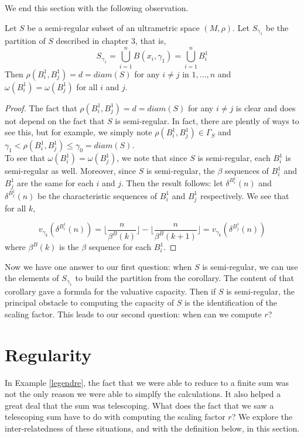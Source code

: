 We end this section with the following observation.

\begin{proposition}
	Let $S$ be a semi-regular subset of an ultrametric space $(M,\rho)$. Let $S_{\gamma_1}$ be the partition of $S$ described in chapter $3$, that is,
	\[S_{\gamma_1} = \bigcup_{i=1}^{n} B(x_i,\gamma_1) = \bigcup_{i=1}^{n} B^1_i\]
	Then $\rho(B^1_i, B^1_j) = d = diam(S)$ for any $i \neq j$ in $1,\ldots,n$ and $\omega( B^1_i) = \omega( B^1_j)$ for all $i$ and $j$.
\end{proposition}

\begin{proof}
	The fact that  $\rho(B^1_i, B^1_j) = d = diam(S)$ for any $i \neq j$ is clear and does not depend on the fact that $S$ is semi-regular. In fact, there are plently of ways to see this, but for example, we simply note $\rho(B^1_i, B^1_j) \in \Gamma_S$  and $ \gamma_1 < \rho(B^1_i, B^1_j)\leq \gamma_0 = diam(S)$.\\
	
	To see that $\omega( B^1_i) = \omega( B^1_j)$, we note that since $S$ is semi-regular, each $B^1_i$ is semi-regular as well. Moreover, since $S$ is semi-regular, the $\beta$ sequences of $B^1_i$ and $B^1_j$ are the same for each $i$ and $j$. Then the result follows: let $\delta^{B^1_i}(n)$ and $\delta^{B^1_j}(n)$ be the characteristic sequences of $B^1_i$ and $B^1_j$ respectively. We see that for all $k$,
	  
	  \[v_{\gamma_k}(\delta^{B^1_i}(n)) =  \lfloor\frac{n}{\beta^B(k)}\rfloor - \lfloor\frac{n}{\beta^B(k+1)}\rfloor =  v_{\gamma_k}(\delta^{B^1_j}(n)) \]
	where $\beta^B(k)$ is the $\beta$ sequence for each  $B^1_i$.
	 
\end{proof}

Now we have one answer to our first question: when $S$ is semi-regular, we can use the elements of $S_{\gamma_1}$ to build the partition from the corollary. The content of that corollary gave a formula for the valuative capacity. Then if $S$ is semi-regular, the principal obstacle to computing the capacity of $S$ is the identification of the scaling factor. This leads to our second question: when can we compute $r$?

\section{Regularity}
In Example \ref{legendre}, the fact that we were able to reduce to a finite sum was not the only reason we were able to simplfy the calculations. It also helped a great deal that the sum was telescoping. What does the fact that we saw a telescoping sum have to do with computing the scaling factor $r$? We explore the inter-relatedness of these situations, and with the definition below, in this section.

